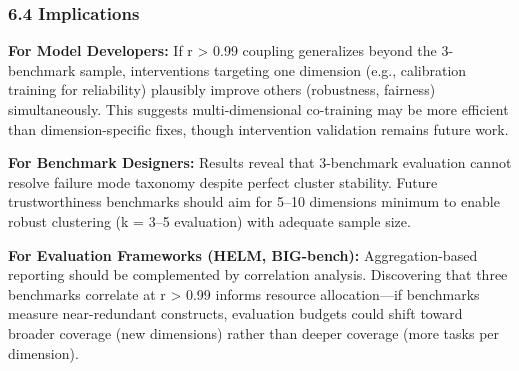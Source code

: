 \subsubsection{6.4 Implications}

\textbf{For Model Developers:} If r > 0.99 coupling generalizes beyond the 3-benchmark sample, interventions targeting one dimension (e.g., calibration training for reliability) plausibly improve others (robustness, fairness) simultaneously. This suggests multi-dimensional co-training may be more efficient than dimension-specific fixes, though intervention validation remains future work.

\textbf{For Benchmark Designers:} Results reveal that 3-benchmark evaluation cannot resolve failure mode taxonomy despite perfect cluster stability. Future trustworthiness benchmarks should aim for 5--10 dimensions minimum to enable robust clustering (k = 3--5 evaluation) with adequate sample size.

\textbf{For Evaluation Frameworks (HELM, BIG-bench):} Aggregation-based reporting should be complemented by correlation analysis. Discovering that three benchmarks correlate at r > 0.99 informs resource allocation---if benchmarks measure near-redundant constructs, evaluation budgets could shift toward broader coverage (new dimensions) rather than deeper coverage (more tasks per dimension).
